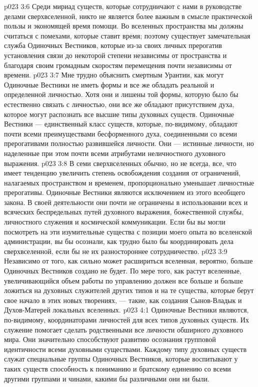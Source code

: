 \vs p023 3:6 Среди мириад существ, которые сотрудничают с нами в руководстве делами сверхвселенной, никто не является более важным в смысле практической пользы и экономящей время помощи. Во вселенных пространства мы должны считаться с помехами, которые ставит время; поэтому существует замечательная служба Одиночных Вестников, которые из\hyp{}за своих личных прерогатив установления связи до некоторой степени независимы от пространства и благодаря своим громадным скоростям перемещения почти независимы от времени.
\vs p023 3:7 \pc Мне трудно объяснить смертным Урантии, как могут Одиночные Вестники не иметь формы и все же обладать реальной и определенной личностью. Хотя они и лишены той формы, которую было бы естественно связать с личностью, они все же обладают присутствием духа, которое могут распознать все высшие типы духовных существ. Одиночные Вестники --- единственный класс существ, которые, по\hyp{}видимому, обладают почти всеми преимуществами бесформенного духа, соединенными со всеми прерогативами полностью развившейся личности. Они --- истинные личности, но наделенные при этом почти всеми атрибутами неличностного духовного выражения.
\vs p023 3:8 В семи сверхвселенных обычно, но не всегда, все, что имеет тенденцию увеличить степень освобождения создания от ограничений, налагаемых пространством и временем, пропорционально уменьшает личностные прерогативы. Одиночные Вестники являются исключением из этого всеобщего закона. В своей деятельности они почти не ограничены в использовании всех и всяческих беспредельных путей духовного выражения, божественной службы, личностного служения и космической коммуникации. Если бы вы могли посмотреть на эти изумительные существа с позиции моего опыта во вселенской администрации, вы бы осознали, как трудно было бы координировать дела сверхвселенной, если бы не их разностороннее сотрудничество.
\vs p023 3:9 Независимо от того, как сильно может расшириться вселенная, вероятно, больше Одиночных Вестников создано не будет. По мере того, как растут вселенные, увеличивающийся объем работы по управлению должен все больше и больше ложиться на духовных служителей других типов и на те существа, которые берут свое начало в этих новых творениях, --- такие, как создания Сынов\hyp{}Владык и Духов\hyp{}Матерей локальных вселенных.
\vs p023 4:1 Одиночные Вестники являются, по\hyp{}видимому, координаторами личностей для всех типов духовных существ. Их служение помогает сделать родственными все личности обширного духовного мира. Они значительно способствуют развитию осознания групповой идентичности всеми духовными существами. Каждому типу духовных существ служат специальные группы Одиночных Вестников, которые воспитывают у таких существ способность к пониманию и братскому единению со всеми другими группами и чинами, какими бы различными они ни были.
